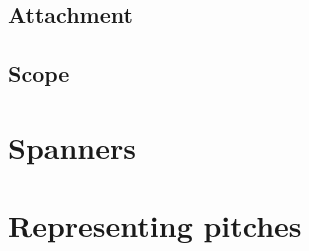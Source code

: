\subsection{Attachment}

\subsection{Scope}

\begin{comment}
Indicators attach to individual components
-   some have notational reality
-   some have context scope
-   but they can be totally arbitrary
-   attach(x, y, scope=..., is_annotation=..., name=...)
-   Articulation
-   BarLine
-   Clef
-   Dynamic
-   KeySignature
-   Markup
-   Tempo
-   TimeSignature
-   What is scope?
-   Default scope
-   Explicit scope
-   Idiomatic indicators, used by other processes:
    -   BowContactPoint
    -   IsAtSoundingPitch
    -   IsUnpitched
    -   StringContactPoint
    -   StringTuning
    -   etc.
-   Annotation
-   attach(x, y, is_annotation=True)
-   inspect_(...).get_indicator()
-   inspect_(...).has_indicator()
-   inspect_(...).get_effective()
-   inspect_(...).has_effective_indicator()
\end{comment}

\section{Spanners}

\begin{comment}
Spanners *span* across different levels of hierarchy.
-   logical voices
-   attach to
-   graph cyclicity
-   Beam
-   Glissando
-   Hairpin
-   Slur
-   Trill
-   Tie
-   typographic overrides
# Typographic overrides
-   On components
    - \\override & \\revert
-   On spanners
# Modeling time
-   Duration
-   Offset
-   Multiplier
-   Timespan
-   Prolation
-   Pre-prolated durations
-   Contents duration
\end{comment}

\section{Representing pitches}

